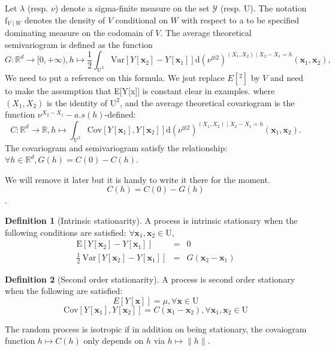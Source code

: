 \documentclass[12pt]{article}
\theoremstyle{definition}
\newtheorem{definition}{Definition}[section]
\theoremstyle{remark}
\newcommand{\dominantU}{\nu}
\newcommand{\dominantY}{\lambda}
\newcommand{\Covariogram}{C}
\newcommand{\Cov}{\mathrm{Cov}}
\newcommand{\derive}{\mathrm{d}}
\newcommand{\density}{\mathrm{f}}
\newcommand{\Semivariogram}{G}
\newcommand{\Pop}{\mathrm{U}}
\newcommand{\Var}{\mathrm{Var}}
\newcommand{\position}{\mathbf{x}}
\newcommand{\SignalSpace}{\mathscr{Y}}
\newcommand{\Signal}{Y}
\begin{document}
Let $\dominantY$ (resp. $\dominantU$) denote a sigma-finite measure on the set $\SignalSpace$ (resp. $\Pop$).
The notation $\density_{V\mid W}$ denotes the density of $V$ conditional on $W$ with respect to a to be specified dominating measure on the codomain of $V$.
The average theoretical semivariogram is defined as the function $$\Semivariogram:\mathbb{R}^d\to[0,+\infty),h\mapsto\frac12\int_{\Pop^2} \Var\left[\Signal[\position_2]-\Signal[\position_1]\right] \derive(\dominantU^{\otimes 2})^{(X_1,X_2)\mid X_2-X_1=h}(\position_1,\position_2),$$
{\color{red} We need to put a reference on this formula. We jsut replace $E[^2]$ by $V$ and need to make the assumption that E[Y[x]] is constant clear in examples.}
where $(X_1,X_2)$ is the identity of $\Pop^{2}$, and the average theoretical covariogram is the function  $\nu^{X_2-X_1}-a.s(h)$-defined:
$$\Covariogram:\mathbb{R}^d\to\mathbb{R}, h\mapsto\int_{\Pop^2} \Cov\left[\Signal[\position_1],\Signal[\position_2]\right] \derive(\dominantU^{\otimes 2})^{(X_1,X_2)\mid X_2-X_1=h}(\position_1,\position_2).$$ The covariogram and semivariogram satisfy the relationship: $\forall h\in\mathbb{R}^d, \Semivariogram(h)=\Covariogram(0)-\Covariogram(h)$.

{\color{red}We will remove it later but it is handy to write it there for the moment. $$\Covariogram(h)=\Covariogram(0)-\Semivariogram(h)$$.}

\begin{definition}[Intrinsic stationarity]
A process is intrinsic stationary when the following conditions are satisfied:  $\forall \position_1,\position_2\in\Pop$,
\begin{eqnarray}
    \mathrm{E}\left[\Signal\left[\position_2\right]-\Signal\left[\position_1\right]\right]&=&0\\
    \frac12~\Var\left[\Signal\left[\position_2\right]-\Signal\left[\position_1\right]\right]&=&\Semivariogram(\position_2-\position_1)\label{eq:semivariogram}
\end{eqnarray}


\end{definition}


\begin{definition}[Second order stationarity]
A process is second order stationary when the following are satisfied:
\begin{equation}
    E\left[\Signal\left[\position\right]\right]=\mu,\forall\position\in \Pop
\end{equation}
\begin{equation} \label{eq:covariogram}
    \Cov\left[\Signal\left[\position_{1}\right],\Signal\left[\position_{2}\right]\right]=C\left(\position_{1}-\position_{2}\right),\forall\position_{1},\position_{2}\in \Pop
\end{equation}
\end{definition}
The random process is isotropic if in addition on being stationary, the covaiogram function $h\mapsto \Covariogram(h)$ only depends on $h$ via $h\mapsto\|h\|$.
\end{document}

